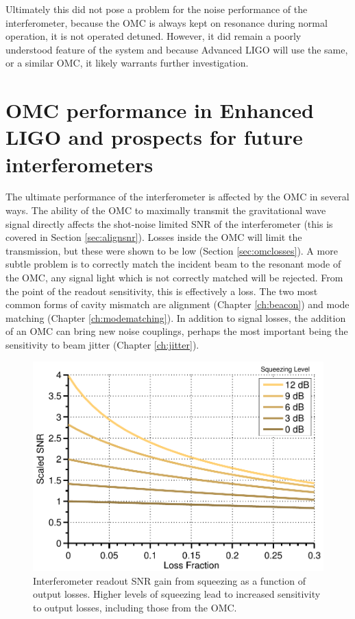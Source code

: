 Ultimately this did not pose a problem for the noise performance of the interferometer, because the OMC is always kept on resonance during normal operation, it is not operated detuned. %
However, it did remain a poorly understood feature of the system and because Advanced LIGO will use the same, or a similar OMC, it likely warrants further investigation.

\section{OMC performance in Enhanced LIGO and prospects for future interferometers}

The ultimate performance of the interferometer is affected by the OMC in several ways. %
The ability of the OMC to maximally transmit the gravitational wave signal directly affects the shot-noise limited SNR of the interferometer (this is covered in Section \ref{sec:alignsnr}). %
Losses inside the OMC will limit the transmission, but these were shown to be low (Section \ref{sec:omclosses}). %
A more subtle problem is to correctly match the incident beam to the resonant  mode of the OMC, any signal light which is not correctly matched will be rejected. %
From the point of the readout sensitivity, this is effectively a loss. %
The two most common forms of cavity mismatch are alignment (Chapter \ref{ch:beacon}) and mode matching (Chapter \ref{ch:modematching}). %
In addition to signal losses, the addition of an OMC can bring new noise couplings, perhaps the most important being the sensitivity to beam jitter (Chapter \ref{ch:jitter}).

\begin{figure}[h!]
  \begin{center}
  \leavevmode
  \includegraphics{figs-omc/squeezeplot.pdf}
  \end{center}
  \caption[Interferometer readout SNR gain from squeezing as a function of output losses.]{Interferometer readout SNR gain from squeezing as a function of output losses. Higher levels of squeezing lead to increased sensitivity to output losses, including those from the OMC.}
  \label{fig:squeezeplot}
\end{figure}

